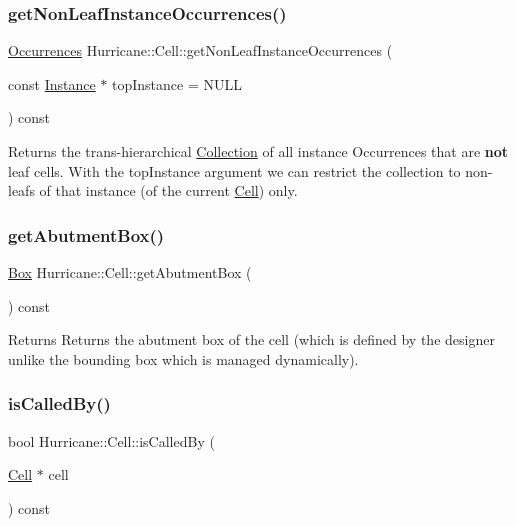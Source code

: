 \subsubsection{\texorpdfstring{get\+Non\+Leaf\+Instance\+Occurrences()}{getNonLeafInstanceOccurrences()}}
{\footnotesize\ttfamily \mbox{\hyperlink{namespaceHurricane_a1912927c128eee859af62dbe4cbe0a6b}{Occurrences}} Hurricane\+::\+Cell\+::get\+Non\+Leaf\+Instance\+Occurrences (\begin{DoxyParamCaption}\item[{const \mbox{\hyperlink{classHurricane_1_1Instance}{Instance}} $\ast$}]{top\+Instance = {\ttfamily NULL} }\end{DoxyParamCaption}) const}

Returns the trans-\/hierarchical \mbox{\hyperlink{classHurricane_1_1Collection}{Collection}} of all instance Occurrences that are {\bfseries not} leaf cells. With the {\ttfamily top\+Instance} argument we can restrict the collection to non-\/leafs of that instance (of the current \mbox{\hyperlink{classHurricane_1_1Cell}{Cell}}) only. \mbox{\label{classHurricane_1_1Cell_a142360ca7b3c1c637894f5b9a2cac069}} 
\subsubsection{\texorpdfstring{get\+Abutment\+Box()}{getAbutmentBox()}}
{\footnotesize\ttfamily \mbox{\hyperlink{classHurricane_1_1Box}{Box}} Hurricane\+::\+Cell\+::get\+Abutment\+Box (\begin{DoxyParamCaption}{ }\end{DoxyParamCaption}) const\hspace{0.3cm}{\ttfamily [inline]}}

Returns Returns the abutment box of the cell (which is defined by the designer unlike the bounding box which is managed dynamically). \mbox{\label{classHurricane_1_1Cell_a239354e1b4ad9b751abf5a064e43b0e6}} 
\subsubsection{\texorpdfstring{is\+Called\+By()}{isCalledBy()}}
{\footnotesize\ttfamily bool Hurricane\+::\+Cell\+::is\+Called\+By (\begin{DoxyParamCaption}\item[{\mbox{\hyperlink{classHurricane_1_1Cell}{Cell}} $\ast$}]{cell }\end{DoxyParamCaption}) const}

